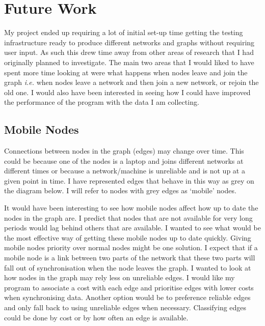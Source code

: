 \documentclass[12pt]{article}
\begin{document}
\newpage
\section{Future Work}
My project ended up requiring a lot of initial set-up
time getting the testing infrastructure ready to
produce different networks and graphs without requiring
user input. As such this drew time away from other
areas of research that I had originally planned to
investigate. The main two areas that I would liked
to have spent more time looking at were what happens
when nodes leave and join the graph \emph{i.e.} when
nodes leave a network and then join a new network, or
rejoin the old one. I would also have been interested
in seeing how I could have improved the performance
of the program with the data I am collecting.

\subsection{Mobile Nodes}
\label{sec:mobile}
Connections between nodes in the graph (edges) may
change over time. This could be because one of the nodes
is a laptop and joins different networks at different
times or because a network/machine is unreliable and is
not up at a given point in time. I have represented
edges that behave in this way as grey on the diagram below.
I will refer to nodes with grey edges as `mobile' nodes.

It would have been interesting to see how mobile nodes affect how
up to date the nodes in the graph are. I predict that
nodes that are not available for very long periods would lag behind
others that are available. I wanted to see what would be
the most effective way of getting these mobile nodes
up to date quickly. Giving mobile nodes priority over
normal nodes might be one solution.
I expect that if a mobile
node is a link between two parts of the network that
these two parts will fall out of synchronisation when the node
leaves the graph. I wanted to look
at how nodes in the graph may 
rely less on unreliable edges. I would like my program
to associate a cost with each edge and prioritise edges
with lower costs when synchronising data. Another option
would be to preference reliable edges and only fall back to using
unreliable edges when necessary. Classifying edges could be
done by cost or by how often an edge is available.
\end{document}
